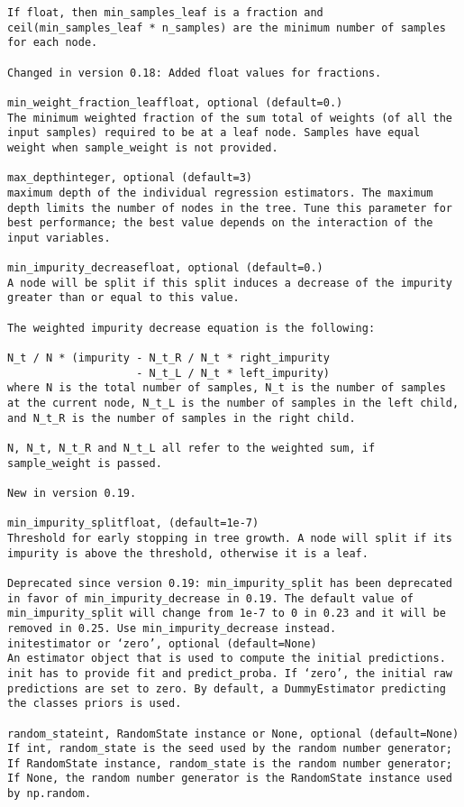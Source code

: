 \documentclass[12pt]{article}
\begin{document}
\begin{verbatim}
If float, then min_samples_leaf is a fraction and ceil(min_samples_leaf * n_samples) are the minimum number of samples for each node.

Changed in version 0.18: Added float values for fractions.

min_weight_fraction_leaffloat, optional (default=0.)
The minimum weighted fraction of the sum total of weights (of all the input samples) required to be at a leaf node. Samples have equal weight when sample_weight is not provided.

max_depthinteger, optional (default=3)
maximum depth of the individual regression estimators. The maximum depth limits the number of nodes in the tree. Tune this parameter for best performance; the best value depends on the interaction of the input variables.

min_impurity_decreasefloat, optional (default=0.)
A node will be split if this split induces a decrease of the impurity greater than or equal to this value.

The weighted impurity decrease equation is the following:

N_t / N * (impurity - N_t_R / N_t * right_impurity
                    - N_t_L / N_t * left_impurity)
where N is the total number of samples, N_t is the number of samples at the current node, N_t_L is the number of samples in the left child, and N_t_R is the number of samples in the right child.

N, N_t, N_t_R and N_t_L all refer to the weighted sum, if sample_weight is passed.

New in version 0.19.

min_impurity_splitfloat, (default=1e-7)
Threshold for early stopping in tree growth. A node will split if its impurity is above the threshold, otherwise it is a leaf.

Deprecated since version 0.19: min_impurity_split has been deprecated in favor of min_impurity_decrease in 0.19. The default value of min_impurity_split will change from 1e-7 to 0 in 0.23 and it will be removed in 0.25. Use min_impurity_decrease instead.
initestimator or ‘zero’, optional (default=None)
An estimator object that is used to compute the initial predictions. init has to provide fit and predict_proba. If ‘zero’, the initial raw predictions are set to zero. By default, a DummyEstimator predicting the classes priors is used.

random_stateint, RandomState instance or None, optional (default=None)
If int, random_state is the seed used by the random number generator; If RandomState instance, random_state is the random number generator; If None, the random number generator is the RandomState instance used by np.random.


\end{verbatim}
\end{document}
